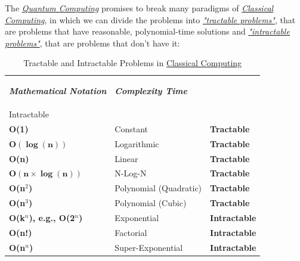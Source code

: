 \documentclass[conference]{IEEEtran}
\begin{document}
The \href{https://en.wikipedia.org/wiki/Quantum_computing}{\textit{Quantum Computing}} promises to break many paradigms of \href{https://en.wikipedia.org/wiki/Von_Neumann_architecture}{\textit{Classical Computing}}, in which we can divide the problems into \href{http://www.cs.ucc.ie/~dgb/courses/toc/handout29.pdf}{\textit{"tractable problems"}}, that are problems that have reasonable, polynomial-time solutions and \href{http://www.cs.ucc.ie/~dgb/courses/toc/handout29.pdf}{\textit{"intractable problems"}}, that are problems that don't have it:

\begin{table}[!hp]
\centering
    \caption{Tractable and Intractable Problems in \href{https://en.wikipedia.org/wiki/Von_Neumann_architecture}{Classical Computing}}
    \begin{tabular}{ |p{2.2cm}|p{3cm}|p{2.2cm}| }
     \hline
     \begin{center}\textbf{\textit{Mathematical Notation}}\end{center} & \begin{center}\textbf{\textit{Complexity Time}}\end{center} & \begin{center}\textbf{\textit{Tractable/\\Intractable}}\end{center}\\
     \hline
     \hline
     \textbf{O(1)} & Constant & \textbf{Tractable} \\
     \hline
     $\bm{O(\log(n))}$ & Logarithmic & \textbf{Tractable} \\
     \hline
     \textbf{O(n)} & Linear & \textbf{Tractable} \\
     \hline
     $\bm{O(n\times\log(n))}$ & N-Log-N & \textbf{Tractable} \\
     \hline
     \textbf{O(n$^{2}$)} & Polynomial (Quadratic) & \textbf{Tractable} \\
     \hline
     \textbf{O(n$^{3}$)} & Polynomial (Cubic) & \textbf{Tractable} \\
     \hline
     \hline
     \textbf{O(k$^{n}$), e.g., O(2$^{n}$)} & Exponential & \textbf{Intractable} \\
     \hline
     \textbf{O(n!)} & Factorial & \textbf{Intractable} \\
     \hline
     \textbf{O(n$^{n}$)} & Super-Exponential & \textbf{Intractable} \\
     \hline
    \end{tabular}
\end{table}
\end{document}

